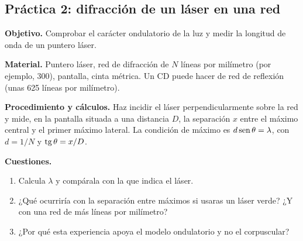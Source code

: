 \subsection{Práctica 2: difracción de un láser en una red}\label{subsec:cua-practica-red}

\textbf{Objetivo.} Comprobar el carácter ondulatorio de la luz y medir la longitud de onda de un puntero láser.

\textbf{Material.} Puntero láser, red de difracción de \(N\) líneas por milímetro (por ejemplo, 300), pantalla, cinta métrica. Un CD
puede hacer de red de reflexión (unas 625 líneas por milímetro).

\textbf{Procedimiento y cálculos.} Haz incidir el láser perpendicularmente sobre la red y mide, en la pantalla situada a una distancia
\(D\), la separación \(x\) entre el máximo central y el primer máximo lateral. La condición de máximo es \(d\operatorname{sen}\theta = \lambda\), con
\(d = 1/N\) y \(\operatorname{tg}\theta = x/D\).

\textbf{Cuestiones.}
\begin{enumerate}[label=\letraminuscula]
    \item Calcula \(\lambda\) y compárala con la que indica el láser.
    \item ¿Qué ocurriría con la separación entre máximos si usaras un láser verde? ¿Y con una red de más líneas por milímetro?
    \item ¿Por qué esta experiencia apoya el modelo ondulatorio y no el corpuscular?
\end{enumerate}
